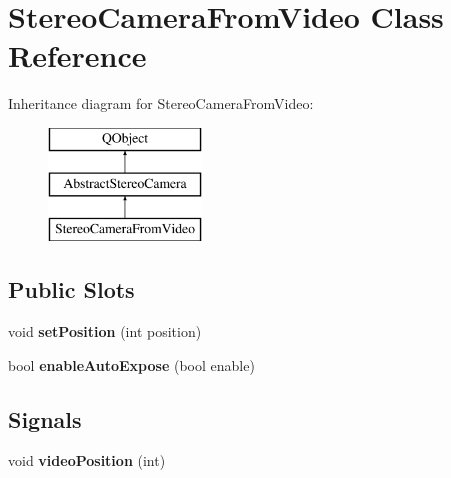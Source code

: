 \hypertarget{class_stereo_camera_from_video}{}\section{Stereo\+Camera\+From\+Video Class Reference}
\label{class_stereo_camera_from_video}
Inheritance diagram for Stereo\+Camera\+From\+Video\+:\begin{figure}[H]
\begin{center}
\leavevmode
\includegraphics[height=3.000000cm]{class_stereo_camera_from_video}
\end{center}
\end{figure}
\subsection*{Public Slots}
\begin{DoxyCompactItemize}
\item 
\hypertarget{class_stereo_camera_from_video_ab0ea47d4b231ebbc892ca5b51773add9}{}void {\bfseries set\+Position} (int position)\label{class_stereo_camera_from_video_ab0ea47d4b231ebbc892ca5b51773add9}

\item 
\hypertarget{class_stereo_camera_from_video_a3699596ba9de3b2ae1959da6a6097cf3}{}bool {\bfseries enable\+Auto\+Expose} (bool enable)\label{class_stereo_camera_from_video_a3699596ba9de3b2ae1959da6a6097cf3}

\end{DoxyCompactItemize}
\subsection*{Signals}
\begin{DoxyCompactItemize}
\item 
\hypertarget{class_stereo_camera_from_video_ad9a777afd6aede6d23d09e4b86430669}{}void {\bfseries video\+Position} (int)\label{class_stereo_camera_from_video_ad9a777afd6aede6d23d09e4b86430669}

\end{DoxyCompactItemize}
